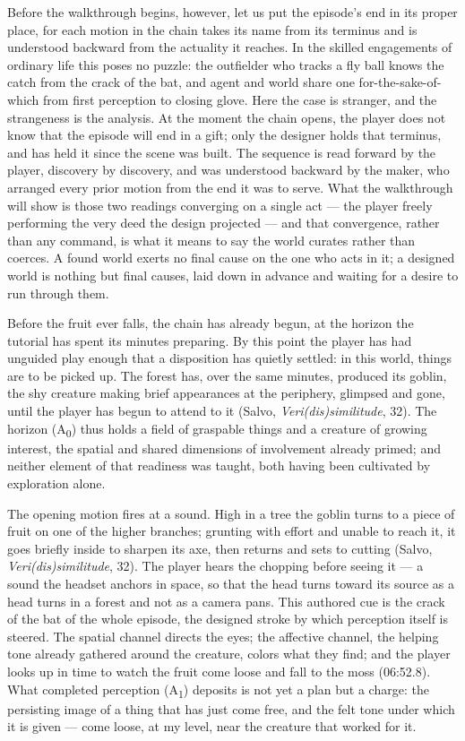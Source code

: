 Before the walkthrough begins, however, let us put the episode's end in its proper place, for each motion in the chain takes its name from its terminus and is understood backward from the actuality it reaches. In the skilled engagements of ordinary life this poses no puzzle: the outfielder who tracks a fly ball knows the catch from the crack of the bat, and agent and world share one for-the-sake-of-which from first perception to closing glove. Here the case is stranger, and the strangeness is the analysis. At the moment the chain opens, the player does not know that the episode will end in a gift; only the designer holds that terminus, and has held it since the scene was built. The sequence is read forward by the player, discovery by discovery, and was understood backward by the maker, who arranged every prior motion from the end it was to serve. What the walkthrough will show is those two readings converging on a single act — the player freely performing the very deed the design projected — and that convergence, rather than any command, is what it means to say the world curates rather than coerces. A found world exerts no final cause on the one who acts in it; a designed world is nothing but final causes, laid down in advance and waiting for a desire to run through them.

Before the fruit ever falls, the chain has already begun, at the horizon the tutorial has spent its minutes preparing. By this point the player has had unguided play enough that a disposition has quietly settled: in this world, things are to be picked up. The forest has, over the same minutes, produced its goblin, the shy creature making brief appearances at the periphery, glimpsed and gone, until the player has begun to attend to it (Salvo, \textit{Veri(dis)similitude}, 32). The horizon (A\textsubscript{0}) thus holds a field of graspable things and a creature of growing interest, the spatial and shared dimensions of involvement already primed; and neither element of that readiness was taught, both having been cultivated by exploration alone.

The opening motion fires at a sound. High in a tree the goblin turns to a piece of fruit on one of the higher branches; grunting with effort and unable to reach it, it goes briefly inside to sharpen its axe, then returns and sets to cutting (Salvo, \textit{Veri(dis)similitude}, 32). The player hears the chopping before seeing it — a sound the headset anchors in space, so that the head turns toward its source as a head turns in a forest and not as a camera pans. This authored cue is the crack of the bat of the whole episode, the designed stroke by which perception itself is steered. The spatial channel directs the eyes; the affective channel, the helping tone already gathered around the creature, colors what they find; and the player looks up in time to watch the fruit come loose and fall to the moss (06:52.8). What completed perception (A\textsubscript{1}) deposits is not yet a plan but a charge: the persisting image of a thing that has just come free, and the felt tone under which it is given — come loose, at my level, near the creature that worked for it.

